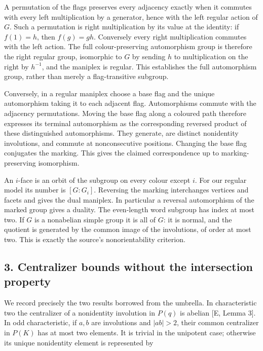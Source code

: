 \documentclass[
  11pt,
]{article}
\begin{document}
A permutation of the flags preserves every adjacency exactly when it
commutes with every left multiplication by a generator, hence with the
left regular action of \(G\). Such a permutation is right multiplication
by its value at the identity: if \(f(1)=h\), then \(f(g)=gh\).
Conversely every right multiplication commutes with the left action. The
full colour-preserving automorphism group is therefore the right regular
group, isomorphic to \(G\) by sending \(h\) to multiplication on the
right by \(h^{-1}\), and the maniplex is regular. This establishes the
full automorphism group, rather than merely a flag-transitive subgroup.

Conversely, in a regular maniplex choose a base flag and the unique
automorphism taking it to each adjacent flag. Automorphisms commute with
the adjacency permutations. Moving the base flag along a coloured path
therefore expresses its terminal automorphism as the corresponding
reversed product of these distinguished automorphisms. They generate,
are distinct nonidentity involutions, and commute at nonconsecutive
positions. Changing the base flag conjugates the marking. This gives the
claimed correspondence up to marking-preserving isomorphism.

An \(i\)-face is an orbit of the subgroup on every colour except \(i\).
For our regular model its number is \([G:G_i]\). Reversing the marking
interchanges vertices and facets and gives the dual maniplex. In
particular a reversal automorphism of the marked group gives a duality.
The even-length word subgroup has index at most two. If \(G\) is a
nonabelian simple group it is all of \(G\): it is normal, and the
quotient is generated by the common image of the involutions, of order
at most two. This is exactly the source's nonorientability criterion.

\subsection{3. Centralizer bounds without the intersection
property}\label{centralizer-bounds-without-the-intersection-property}

We record precisely the two results borrowed from the umbrella. In
characteristic two the centralizer of a nonidentity involution in
\(P(q)\) is abelian {[}E, Lemma 3{]}. In odd characteristic, if \(a,b\)
are involutions and \(|ab|>2\), their common centralizer in \(P(K)\) has
at most two elements. It is trivial in the unipotent case; otherwise its
unique nonidentity element is represented by
\end{document}
